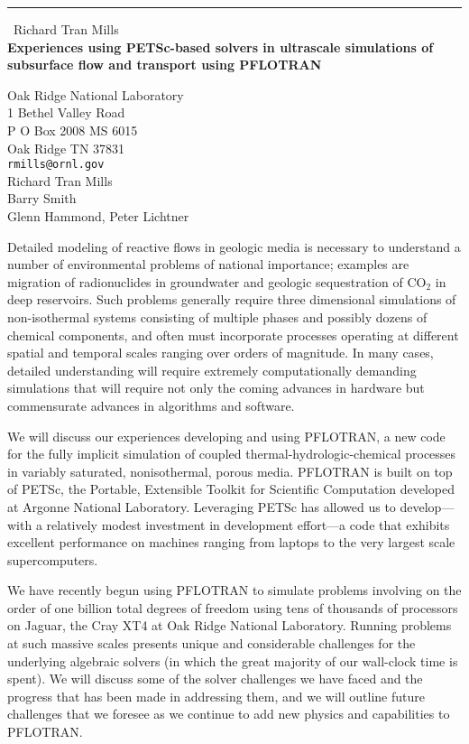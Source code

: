 \documentclass{report}
\begin{document}
\begin{center}
\rule{6in}{1pt} \
{\large Richard Tran Mills \\
{\bf Experiences using PETSc-based solvers in ultrascale simulations of subsurface flow and transport using PFLOTRAN}}

Oak Ridge National Laboratory \\ 1 Bethel Valley Road \\ P O Box 2008 MS 6015 \\ Oak Ridge TN 37831
\\
{\tt rmills@ornl.gov}\\
Richard Tran Mills\\
Barry Smith\\
	Glenn Hammond, Peter Lichtner\end{center}

Detailed modeling of reactive flows in geologic media is necessary to
understand a number of environmental problems of national importance;
examples are migration of radionuclides in groundwater and geologic
sequestration of CO$_2$ in deep reservoirs. Such problems generally require
three dimensional simulations of non-isothermal systems consisting of
multiple phases and possibly dozens of chemical components, and often must
incorporate processes operating at different spatial and temporal scales
ranging over orders of magnitude. In many cases, detailed understanding
will require extremely computationally demanding simulations that will
require not only the coming advances in hardware but commensurate advances
in algorithms and software.

We will discuss our experiences developing and using PFLOTRAN, a new code
for the fully implicit simulation of coupled thermal-hydrologic-chemical
processes in variably saturated, nonisothermal, porous media. PFLOTRAN
is built on top of PETSc, the Portable, Extensible Toolkit for Scientific
Computation developed at Argonne National Laboratory. Leveraging PETSc
has allowed us to develop---with a relatively modest investment in
development effort---a code that exhibits excellent performance on
machines ranging from laptops to the very largest scale supercomputers.

We have recently begun using PFLOTRAN to simulate problems involving
on the order of one billion total degrees of freedom using tens of
thousands of processors on Jaguar, the Cray XT4 at Oak Ridge National
Laboratory. Running problems at such massive scales presents unique
and considerable challenges for the underlying algebraic solvers (in
which the great majority of our wall-clock time is spent). We will
discuss some of the solver challenges we have faced and the progress that
has been made in addressing them, and we will outline future challenges
that we foresee as we continue to add new physics and capabilities to
PFLOTRAN.
\end{document}
